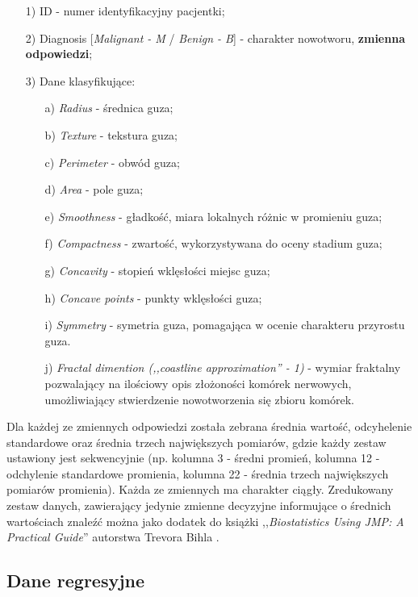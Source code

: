 	\begin{enumerate}
		\item [1)] ID - numer identyfikacyjny pacjentki;
		\item [2)] Diagnosis [\textit{Malignant - M} / \textit{Benign - B}] - charakter nowotworu, \textbf{zmienna odpowiedzi};
		\item [3)] Dane klasyfikujące:
			\begin{enumerate}
				\item [a)] \textit{Radius} - średnica guza;
				\item [b)] \textit{Texture} - tekstura guza;
				\item [c)] \textit{Perimeter} - obwód guza;
				\item [d)] \textit{Area} - pole guza;
				\item [e)] \textit{Smoothness} - gładkość, miara lokalnych różnic w promieniu guza;
				\item [f)] \textit{Compactness} - zwartość, wykorzystywana do oceny stadium guza;
				\item [g)] \textit{Concavity} - stopień wklęsłości miejsc guza;
				\item [h)] \textit{Concave points} - punkty wklęsłości guza;
				\item [i)] \textit{Symmetry} - symetria guza, pomagająca w ocenie charakteru przyrostu guza.
				\item [j)] \textit{Fractal dimention (,,coastline approximation'' - 1)} - wymiar fraktalny pozwalający na ilościowy opis złożoności komórek nerwowych, umożliwiający stwierdzenie nowotworzenia się zbioru komórek.
			\end{enumerate}
	\end{enumerate}
	
	Dla każdej ze zmiennych odpowiedzi została zebrana średnia wartość, odcyhelenie standardowe oraz średnia trzech największych pomiarów, gdzie każdy zestaw ustawiony jest sekwencyjnie (np. kolumna 3 - średni promień, kolumna 12 - odchylenie standardowe promienia, kolumna 22 - średnia trzech największych pomiarów promienia). Każda ze zmiennych ma charakter ciągły. Zredukowany zestaw danych, zawierający jedynie zmienne decyzyjne informujące o średnich wartościach znaleźć można jako dodatek do książki ,,\textit{Biostatistics Using JMP: A Practical Guide}'' autorstwa Trevora Bihla \cite{biostatisticsJMP}.
	
\subsection{Dane regresyjne}

